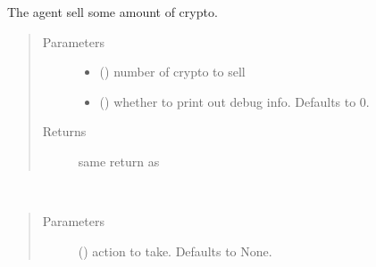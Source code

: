 \documentclass[letterpaper,10pt,english]{sphinxmanual}
\begin{document}
\begin{fulllineitems}

\begin{fulllineitems}
\label{\detokenize{CryptoEnv:crypto_env.core.CryptoEnv.sell}}
\sphinxAtStartPar
The agent sell some amount of crypto.
\begin{quote}\begin{description}
\item[{Parameters}] \leavevmode\begin{itemize}
\item {} 
\sphinxAtStartPar
{} () \textendash{} number of crypto to sell

\item {} 
\sphinxAtStartPar
{} (\sphinxstyleliteralemphasis{\sphinxupquote{, }}) \textendash{} whether to print out debug info. Defaults to 0.

\end{itemize}

\item[{Returns}] \leavevmode
\sphinxAtStartPar
same return as {\hyperref[\detokenize{CryptoEnv:crypto_env.core.CryptoEnv.step}]{}}

\end{description}\end{quote}

\end{fulllineitems}


\begin{fulllineitems}
\label{\detokenize{CryptoEnv:crypto_env.core.CryptoEnv.step}}~\begin{quote}\begin{description}
\item[{Parameters}] \leavevmode
\sphinxAtStartPar
{} (\sphinxstyleliteralemphasis{\sphinxupquote{, }}) \textendash{} action to take. Defaults to None.


\end{description}
\end{quote}
\end{fulllineitems}
\end{fulllineitems}
\end{document}
